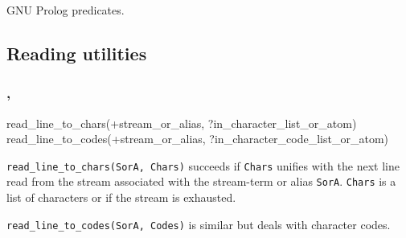 \begin{PlErrors}


 

 


\end{PlErrors}

\Portability

GNU Prolog predicates.

\iffalse
\subsection{Reading utilities}

\subsubsection{,
               }


\begin{TemplatesOneCol}
read\_line\_to\_chars(+stream\_or\_alias, ?in\_character\_list\_or\_atom)\\
read\_line\_to\_codes(+stream\_or\_alias, ?in\_character\_code\_list\_or\_atom)

\end{TemplatesOneCol}

\Description

\texttt{read\_line\_to\_chars(SorA, Chars)} succeeds if \texttt{Chars} unifies
with the next line read from the stream associated with the stream-term or alias
\texttt{SorA}. \texttt{Chars} is a list of characters or  if
the stream is exhausted.

\texttt{read\_line\_to\_codes(SorA, Codes)} is similar but deals with character
codes.

